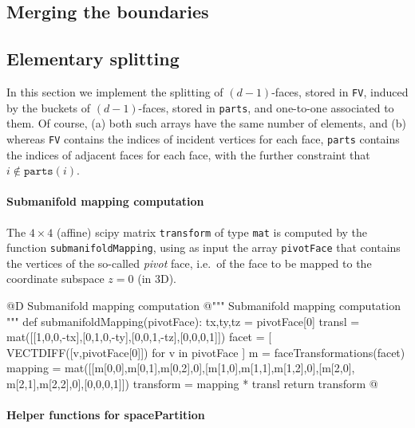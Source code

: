 \documentclass[11pt,oneside]{article}    %
\begin{document}
\subsection{Merging the boundaries}

\subsection{Elementary splitting}

In this section we implement the splitting of $(d-1)$-faces, stored in \texttt{FV}, induced by the buckets of $(d-1)$-faces, stored in \texttt{parts}, and one-to-one associated to them. Of course, (a) both such arrays have the same number of elements, and (b) whereas \texttt{FV} contains the indices of incident vertices for each face, \texttt{parts}  contains the indices of adjacent faces for each face, with the further constraint that $i \not\in \texttt{parts}(i)$.
    
\paragraph{Submanifold mapping computation}
The $4\times 4$ (affine) scipy matrix \texttt{transform} of type \texttt{mat} is computed by the function \texttt{submanifoldMapping}, using as input the array \texttt{pivotFace} that contains the vertices of the so-called \emph{pivot} face, i.e.~of the face to be mapped to the coordinate subspace $z=0$ (in 3D).

@D Submanifold mapping computation
@{""" Submanifold mapping computation """
def submanifoldMapping(pivotFace):
    tx,ty,tz = pivotFace[0]
    transl = mat([[1,0,0,-tx],[0,1,0,-ty],[0,0,1,-tz],[0,0,0,1]])
    facet = [ VECTDIFF([v,pivotFace[0]]) for v in pivotFace ]
    m = faceTransformations(facet)
    mapping = mat([[m[0,0],m[0,1],m[0,2],0],[m[1,0],m[1,1],m[1,2],0],[m[2,0],
                    m[2,1],m[2,2],0],[0,0,0,1]])
    transform = mapping * transl
    return transform
@}

\paragraph{Helper functions for spacePartition}
\end{document}
